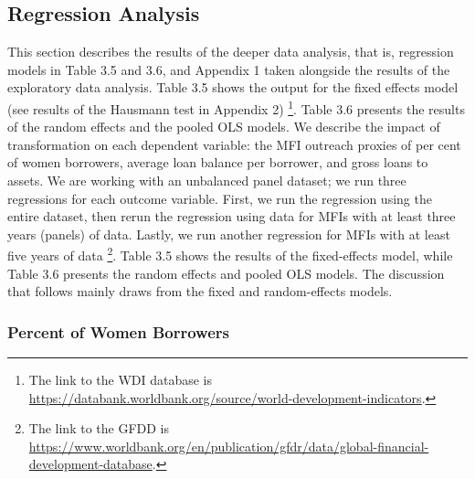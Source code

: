 \documentclass[a4paper, nobind]{templates/ociamthesis}
\begin{document}
\newpage

\hypertarget{regression-analysis}{%
\subsection{Regression Analysis}\label{regression-analysis}}

This section describes the results of the deeper data analysis, that is, regression models in Table 3.5 and 3.6, and Appendix 1 taken alongside the results of the exploratory data analysis. Table 3.5 shows the output for the fixed effects model (see results of the Hausmann test in Appendix 2) \footnote{The link to the WDI database is \url{https://databank.worldbank.org/source/world-development-indicators}.}. Table 3.6 presents the results of the random effects and the pooled OLS models. We describe the impact of transformation on each dependent variable: the MFI outreach proxies of per cent of women borrowers, average loan balance per borrower, and gross loans to assets. We are working with an unbalanced panel dataset; we run three regressions for each outcome variable. First, we run the regression using the entire dataset, then rerun the regression using data for MFIs with at least three years (panels) of data. Lastly, we run another regression for MFIs with at least five years of data \footnote{The link to the GFDD is \url{https://www.worldbank.org/en/publication/gfdr/data/global-financial-development-database}.}. Table 3.5 shows the results of the fixed-effects model, while Table 3.6 presents the random effects and pooled OLS models. The discussion that follows mainly draws from the fixed and random-effects models.

\hypertarget{percent-of-women-borrowers}{%
\subsubsection{Percent of Women Borrowers}\label{percent-of-women-borrowers}}
\end{document}
